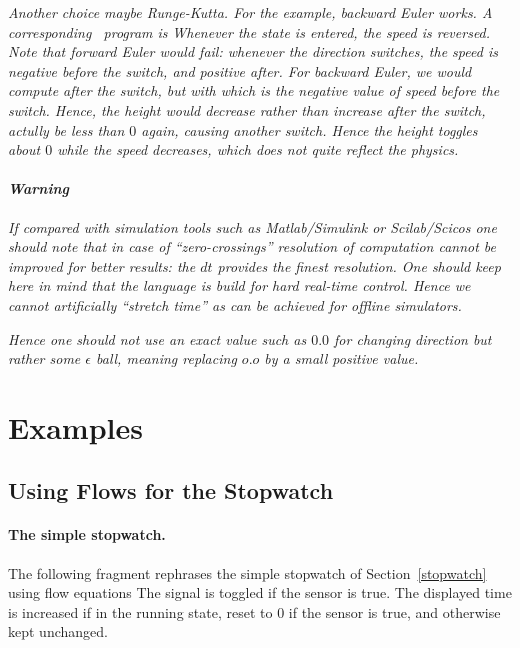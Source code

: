 \emph{Another choice maybe Runge-Kutta. For the example, backward Euler works. A corresponding \se\ program is}
%
%
\emph{Whenever the state  is entered, the speed is reversed. Note that 
forward Euler would fail: whenever the direction switches, the speed
is negative before the switch, and positive after. For backward Euler, we
would compute \emph{} after the switch, but with
 which is the negative value of speed before the switch. Hence,
the height would decrease rather than increase after the switch, actully be 
less than $0$ again, causing another switch. Hence the height toggles about
$0$ while the speed decreases, which does not quite reflect the physics. }

\paragraph{\textit{Warning}} \emph{If compared with simulation tools such as
 Matlab/Simulink or Scilab/Scicos one should note that in case of 
 ``zero-crossings'' resolution of computation cannot be improved for
 better results: the $dt$ provides the finest resolution.
One should keep here in mind that the language is build for hard real-time
control. Hence we cannot artificially ``stretch time'' as can
be achieved for offline simulators. 
}

\emph{Hence one should not use an exact value such as $0.0$ for changing direction
but rather some $\epsilon$ ball, meaning replacing $o.o$ by a small positive value.}

\section{Examples}

\subsection{Using Flows for the Stopwatch}\label{stopwatch-flow}

 
\paragraph{The simple stopwatch.} The following fragment rephrases the
simple stopwatch of Section~\ref{stopwatch} using flow equations
%
%
The signal  is toggled if the sensor  is true.
The displayed time is increased if in the running state, reset to $0$ if
the sensor  is true, and otherwise kept unchanged. 

